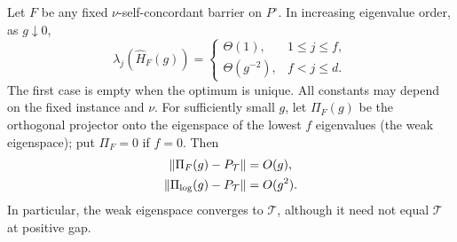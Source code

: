 \begin{theorem}
\label{thm:lp-all-spectra}
Let $F$ be any fixed $\nu$-self-concordant barrier on $P^\circ$.
In increasing eigenvalue order, as $g\downarrow0$,
\begin{equation}
 \lambda_j(\widehat H_F(g))=
 \begin{cases}
  \Theta(1),&1\leq j\leq f,\\
  \Theta(g^{-2}),&f<j\leq d.
 \end{cases}
 \label{eq:lp-all-eigenvalues}
\end{equation}
The first case is empty when the optimum is unique. All constants may
depend on the fixed instance and $\nu$. For sufficiently small $g$, let
$\Pi_F(g)$ be the orthogonal projector onto the eigenspace of the
lowest $f$ eigenvalues (the weak eigenspace); put $\Pi_F=0$ if $f=0$. Then
\begin{align}
 \left\lVert \Pi_F(g)-P_{\mathcal T}\right\rVert&=O(g),
   \label{eq:general-projector-rate}\\
 \left\lVert \Pi_{\log}(g)-P_{\mathcal T}\right\rVert&=O(g^2).
   \label{eq:log-projector-rate}
\end{align}
In particular, the weak eigenspace converges to $\mathcal T$,
although it need not equal $\mathcal T$ at positive gap.
\end{theorem}

